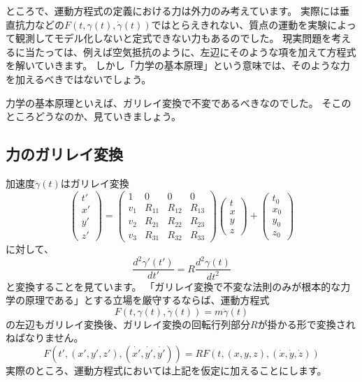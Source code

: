 ところで、運動方程式の定義における力は外力のみ考えています。
実際には垂直抗力などの$F(t,\gamma(t),\dot\gamma(t))$ではとらえきれない、質点の運動を実験によって観測してモデル化しないと定式できない力もあるのでした。
現実問題を考えるに当たっては、例えば空気抵抗のように、左辺にそのような項を加えて方程式を解いていきます。
しかし「力学の基本原理」という意味では、そのような力を加えるべきではないでしょう。

力学の基本原理といえば、ガリレイ変換で不変であるべきなのでした。
そこのところどうなのか、見ていきましょう。

\subsection{力のガリレイ変換}

加速度$\ddot\gamma(t)$はガリレイ変換
\[
  \begin{pmatrix}
    t'\\x'\\y'\\z'
  \end{pmatrix}
  =
  \begin{pmatrix}
    1 & 0 & 0 & 0 \\
    v_1 & R_{11} & R_{12} & R_{13} \\
    v_2 & R_{21} & R_{22} & R_{23} \\
    v_3 & R_{31} & R_{32} & R_{33}
  \end{pmatrix}
  \begin{pmatrix}
    t\\x\\y\\z
  \end{pmatrix}
  +
  \begin{pmatrix}
    t_0\\x_0\\y_0\\z_0
  \end{pmatrix}
\]
に対して、
\[
  \frac{d^2\gamma'(t')}{dt'}=R\frac{d^2\gamma(t)}{dt^2}
\]
と変換することを見ています。
「ガリレイ変換で不変な法則のみが根本的な力学の原理である」とする立場を厳守するならば、運動方程式
\[
  F(t,\gamma(t),\dot\gamma(t))=m\ddot\gamma(t)
\]
の左辺もガリレイ変換後、ガリレイ変換の回転行列部分$R$が掛かる形で変換されねばなりません。
\[
  F(t',(x',y',z'),(\dot{x'},\dot{y'},\dot{y'}))=RF(t,(x,y,z),(\dot{x},\dot{y},\dot{z}))
\]
実際のところ、運動方程式においては上記を仮定に加えることにします。
